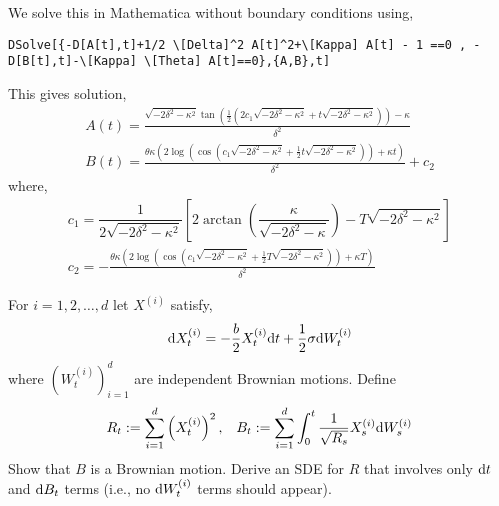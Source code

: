 \begin{solution}[Solution]
We solve this in Mathematica without boundary conditions using,
\begin{lstlisting}
DSolve[{-D[A[t],t]+1/2 \[Delta]^2 A[t]^2+\[Kappa] A[t] - 1 ==0 , -D[B[t],t]-\[Kappa] \[Theta] A[t]==0},{A,B},t]
\end{lstlisting}

This gives solution,
\begin{align*}
    A(t) = \frac{\sqrt{-2 \delta ^2-\kappa ^2} \tan \left(\frac{1}{2} \left(2 c_1 \sqrt{-2 \delta ^2-\kappa ^2}+t \sqrt{-2 \delta ^2-\kappa ^2}\right)\right)-\kappa }{\delta ^2} \\
    B(t) = \frac{\theta  \kappa  \left(2 \log \left(\cos \left(c_1 \sqrt{-2 \delta ^2-\kappa ^2}+\frac{1}{2} t \sqrt{-2 \delta ^2-\kappa ^2}\right)\right)+\kappa  t\right)}{\delta ^2}+c_2
\end{align*}
where,
\begin{align*}
    c_1 = \dfrac{1}{2\sqrt{-2\delta^2-\kappa^2}} \left[ 2\arctan\left(\dfrac{\kappa}{\sqrt{-2\delta^2-\kappa}} \right) - T\sqrt{-2\delta^2-\kappa^2} \right] \\
    c_2 =  -\frac{\theta  \kappa  \left(2 \log \left(\cos \left(c_1 \sqrt{-2 \delta ^2-\kappa ^2}+\frac{1}{2} T \sqrt{-2 \delta ^2-\kappa ^2}\right)\right)+\kappa  T\right)}{\delta ^2}
\end{align*}
\end{solution}


\begin{problem}[Exercise 9.3]
For \( i=1,2, \ldots, d \) let \( X^{(i)} \) satisfy,
    \begin{align*}
        \mathrm{d} X_t^{(i)} = -\dfrac{b}{2} X_t^{(i)} \mathrm{d} t + \dfrac{1}{2}\sigma\mathrm{d} W_t^{(i)}
    \end{align*}
    where \( (W_t^{(i)})_{i=1}^{d} \) are independent Brownian motions. Define
    \begin{align*}
        R_t := \sum_{i=1}^{d} \left(X_t^{(i)}\right)^2, && B_t := \sum_{i=1}^{d} \int_{0}^{t} \dfrac{1}{\sqrt{R_s}}X_s^{(i)} \mathrm{d} W_s^{(i)}
    \end{align*}
    Show that \( B \) is a Brownian motion. Derive an SDE for \( R \) that involves only \( \mathrm{d} t \) and \( \mathrm{d} B_t \) terms (i.e., no \( \mathrm{d} W_t^{(i)} \) terms should appear).
\end{problem}

